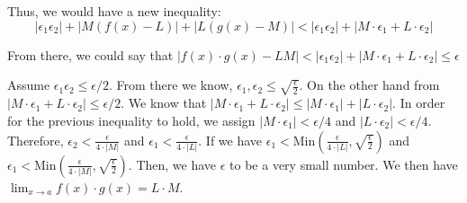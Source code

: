 \documentclass[a4paper,12pt]{report}
\begin{document}
\noindent
Thus, we would have a new inequality:
\[|\epsilon_1\epsilon_2|+|M(f(x)-L)|+|L(g(x)-M)|<|\epsilon_1\epsilon_2|+|M\cdot{\epsilon_1}+L\cdot{\epsilon_2}|\]

\noindent
From there, we could say that $|f(x)\cdot{g(x)}-LM|<|\epsilon_1\epsilon_2|+|M\cdot{\epsilon_1}+L\cdot{\epsilon_2}|\leq \epsilon$

\noindent
Assume $\epsilon_1\epsilon_2\leq \epsilon/2$. From there we know, $\epsilon_1, \epsilon_2 \leq \sqrt{\frac{\epsilon}{2}}$. On the other hand from $|M\cdot{\epsilon_1}+L\cdot{\epsilon_2}|\leq \epsilon/2$. We know that $|M\cdot{\epsilon_1}+L\cdot{\epsilon_2}|\leq |M\cdot{\epsilon_1}|+|L\cdot{\epsilon_2}|$. In order for the previous inequality to hold, we assign $|M\cdot{\epsilon_1}|<\epsilon/4$ and $|L\cdot{\epsilon_2}|<\epsilon/4$. Therefore, $\epsilon_2<\frac{\epsilon}{4\cdot{|M|}}$ and $\epsilon_1<\frac{\epsilon}{4\cdot{|L|}}$. If we have $\epsilon_1<\text{Min}(\frac{\epsilon}{4\cdot{|L|}}, \sqrt{\frac{\epsilon}{2}})$ and $\epsilon_1<\text{Min}(\frac{\epsilon}{4\cdot{|M|}}, \sqrt{\frac{\epsilon}{2}})$. Then, we have $\epsilon$ to be a very small number. We then have $\lim_{x\to a} f(x)\cdot{g(x)}=L\cdot{M}$.
\end{document}
